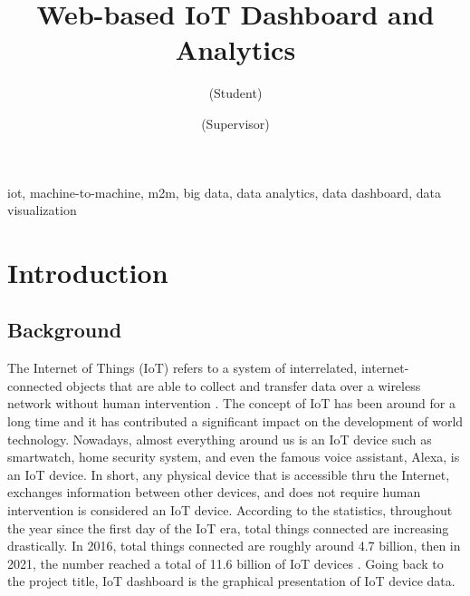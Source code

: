 \documentclass[conference]{IEEEtran}
\begin{document}
\graphicspath{ {./images/} }

\title{Web-based IoT Dashboard and Analytics\\}

\author{
(Student)\\
\and
{}
(Supervisor)\\
}

\maketitle

\begin{IEEEkeywords}
iot, machine-to-machine, m2m, big data, data analytics, data dashboard, data visualization
\end{IEEEkeywords}

\section{Introduction}

\subsection{Background}
The Internet of Things (IoT) refers to a system of interrelated, internet-connected objects
that are able to collect and transfer data over a wireless network without human intervention
\cite{b1}. The concept of IoT has been around for a long time and it has contributed a significant
impact on the development of world technology. Nowadays, almost everything around us is an
IoT device such as smartwatch, home security system, and even the famous voice assistant,
Alexa, is an IoT device. In short, any physical device that is accessible thru the Internet,
exchanges information between other devices, and does not require human intervention is
considered an IoT device. According to the statistics, throughout the year since the first
day of the IoT era, total things connected are increasing drastically. In 2016, total things
connected are roughly around 4.7 billion, then in 2021, the number reached a total of
11.6 billion of IoT devices \cite{b2}. Going back to the project title, IoT dashboard is the
graphical presentation of IoT device data.
\end{document}
